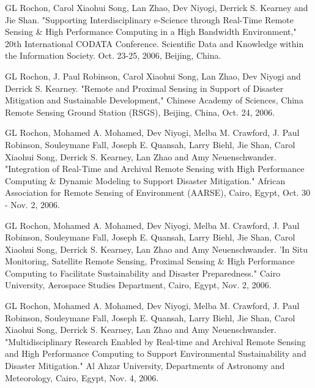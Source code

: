 \documentclass[10pt]{article}
\begin{document}
\begin{bibenum}

    \item GL Rochon, Carol Xiaohui Song, Lan Zhao, Dev Niyogi, Derrick S. Kearney and
          Jie Shan. "Supporting Interdisciplinary e-Science through Real-Time Remote
          Sensing \& High Performance Computing in a High Bandwidth Environment," 20th
          International CODATA Conference. Scientific Data and Knowledge within the
          Information Society. Oct. 23-25, 2006, Beijing, China.

    \item GL Rochon, J. Paul Robinson, Carol Xiaohui Song, Lan Zhao, Dev Niyogi and
          Derrick S. Kearney. "Remote and Proximal Sensing in Support of Disaster
          Mitigation and Sustainable Development," Chinese Academy of Sciences, China
          Remote Sensing Ground Station (RSGS), Beijing, China, Oct. 24, 2006.

    \item GL Rochon, Mohamed A. Mohamed, Dev Niyogi, Melba M. Crawford, J. Paul
          Robinson, Souleymane Fall, Joseph E. Quansah, Larry Biehl, Jie Shan, Carol
          Xiaohui Song, Derrick S. Kearney, Lan Zhao and Amy Neuenschwander.
          "Integration of Real-Time and Archival Remote Sensing with High Performance
          Computing \& Dynamic Modeling to Support Disaster Mitigation." African
          Association for Remote Sensing of Environment (AARSE), Cairo, Egypt, Oct. 30
          - Nov. 2, 2006.

    \item GL Rochon, Mohamed A. Mohamed, Dev Niyogi, Melba M. Crawford, J. Paul
          Robinson, Souleymane Fall, Joseph E. Quansah, Larry Biehl, Jie Shan, Carol
          Xiaohui Song, Derrick S. Kearney, Lan Zhao and Amy Neuenschwander. 'In Situ
          Monitoring, Satellite Remote Sensing, Proximal Sensing \& High Performance
          Computing to Facilitate Sustainability and Disaster Preparedness." Cairo
          University, Aerospace Studies Department, Cairo, Egypt, Nov. 2, 2006.

    \item GL Rochon, Mohamed A. Mohamed, Dev Niyogi, Melba M. Crawford, J. Paul
          Robinson, Souleymane Fall, Joseph E. Quansah, Larry Biehl, Jie Shan, Carol
          Xiaohui Song, Derrick S. Kearney, Lan Zhao and Amy Neuenschwander.
          "Multidisciplinary Research Enabled by Real-time and Archival Remote Sensing
          and High Performance Computing to Support Environmental Sustainability and
          Disaster Mitigation." Al Ahzar University, Departments of Astronomy and
          Meteorology, Cairo, Egypt, Nov. 4, 2006.

\end{bibenum}
\end{document}

